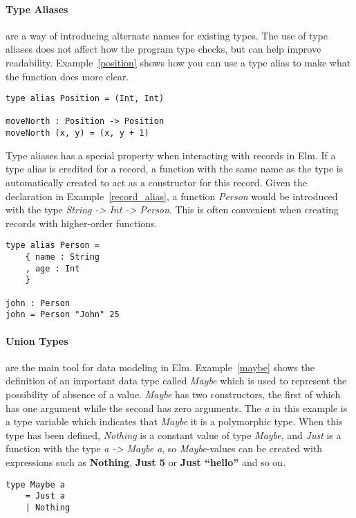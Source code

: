 \documentclass[../thesis.tex]{subfiles}
\begin{document}
\paragraph{Type Aliases} are a way of introducing alternate names for existing types.
The use of type aliases does not affect how the program type checks, but can help improve readability.
Example~\ref{position} shows how you can use a type alias to make what the function does more clear.
\begin{example}\label{position}
\begin{verbatim}
type alias Position = (Int, Int) 

moveNorth : Position -> Position
moveNorth (x, y) = (x, y + 1)
\end{verbatim}
\end{example}
Type aliases has a special property when interacting with records in Elm.
If a type alias is credited for a record, a function with the same name as the type
is automatically created to act as a constructor for this record.
Given the declaration in Example~\ref{record_alias}, a function \textit{Person}
would be introduced with the type \textit{String -> Int -> Person}.
This is often convenient when creating records with higher-order functions.
\begin{example}\label{record_alias}
\begin{verbatim}
type alias Person =
    { name : String
    , age : Int
    }

john : Person
john = Person "John" 25
\end{verbatim}
\end{example}

\paragraph{Union Types} are the main tool for data modeling in Elm.
Example~\ref{maybe} shows the definition of an important data type called \textit{Maybe}
which is used to represent the possibility of absence of a value.
\textit{Maybe} has two constructors, the first of which has one argument while the second has zero arguments.
The \textit{a} in this example is a type variable which indicates that \textit{Maybe} it is a polymorphic type.
When this type has been defined, \textit{Nothing} is a constant value of type \textit{Maybe}, and \textit{Just}
is a function with the type \textit{a -> Maybe a}, so \textit{Maybe}-values can be created
with expressions such as \textbf{Nothing}, \textbf{Just 5} or \textbf{Just ``hello''} and so on.
\begin{example}\label{maybe}
\begin{verbatim}
type Maybe a
    = Just a
    | Nothing
\end{verbatim}
\end{example}
\end{document}
